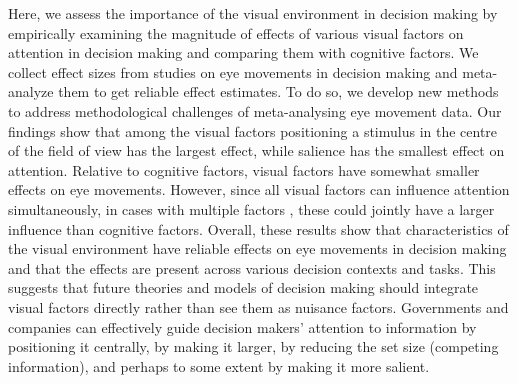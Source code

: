 Here, we assess the importance of the visual environment in decision making by empirically examining the magnitude of effects of various visual factors on attention in decision making and comparing them with cognitive factors.  We collect effect sizes from studies on eye movements in decision making and meta-analyze them to get reliable effect estimates. To do so, we develop new methods to address methodological challenges of meta-analysing eye movement data. Our findings show that among the visual factors positioning a stimulus in the centre of the field of view has the largest effect, while salience has the smallest effect on attention. Relative to cognitive factors, visual factors have somewhat smaller effects on eye movements. However, since all visual factors can influence attention simultaneously, in cases with multiple factors \citep{gidloef2017a, orquin2019a}, these could jointly have a larger influence than cognitive factors. Overall, these results show that characteristics of the visual environment have reliable effects on eye movements in decision making and that the effects are present across various decision contexts and tasks. This suggests that future theories and models of decision making should integrate visual factors directly rather than see them as nuisance factors. Governments and companies can effectively guide decision makers' attention to information by positioning it centrally, by making it larger, by reducing the set size (competing information), and perhaps to some extent by making it more salient.  
